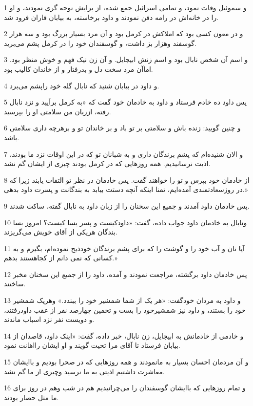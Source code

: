 \par 1 و سموئیل وفات نمود، و تمامی اسرائیل جمع شده، از برایش نوحه گری نمودند، و او را در خانه‌اش در رامه دفن نمودند و داود برخاسته، به بیابان فاران فرود شد.
\par 2 و در معون کسی بود که املاکش در کرمل بود و آن مرد بسیار بزرگ بود و سه هزار گوسفند وهزار بز داشت، و گوسفندان خود را در کرمل پشم می‌برید.
\par 3 و اسم آن شخص نابال بود و اسم زنش ابیجایل. و آن زن نیک فهم و خوش منظر بود. اماآن مرد سخت دل و بدرفتار و از خاندان کالیب بود.
\par 4 و داود در بیابان شنید که نابال گله خود راپشم می‌برد.
\par 5 پس داود ده خادم فرستاد و داود به خادمان خود گفت که «به کرمل برآیید و نزد نابال رفته، اززبان من سلامتی او را بپرسید.
\par 6 و چنین گویید: زنده باش و سلامتی بر تو باد و بر خاندان تو و برهرچه داری سلامتی باشد.
\par 7 و الان شنیده‌ام که پشم برندگان داری و به شبانان تو که در این اوقات نزد ما بودند، اذیت نرسانیدیم. همه روزهایی که در کرمل بودند چیزی از ایشان گم نشد.
\par 8 از خادمان خود بپرس و تو را خواهند گفت. پس خادمان در نظر تو التفات یابند زیرا که در روزسعادتمندی آمده‌ایم، تمنا اینکه آنچه دستت بیابد به بندگانت و پسرت داود بدهی.»
\par 9 پس خادمان داود آمدند و جمیع این سخنان را از زبان داود به نابال گفته، ساکت شدند.
\par 10 ونابال به خادمان داود جواب داده، گفت: «داودکیست و پسر یسا کیست؟ امروز بسا بندگان هریکی از آقای خویش می‌گریزند.
\par 11 آیا نان و آب خود را و گوشت را که برای پشم برندگان خودذبح نموده‌ام، بگیرم و به کسانی که نمی دانم از کجاهستند بدهم.»
\par 12 پس خادمان داود برگشته، مراجعت نمودند و آمده، داود را از جمیع این سخنان مخبر ساختند.
\par 13 و داود به مردان خودگفت: «هر یک از شما شمشیر خود را ببندد.» وهریک شمشیر خود را بستند، و داود نیز شمشیرخود را بست و تخمین چهارصد نفر از عقب داودرفتند، و دویست نفر نزد اسباب ماندند.
\par 14 و خادمی از خادمانش به ابیجایل، زن نابال، خبر داده، گفت: «اینک داود، قاصدان از بیابان فرستاد تا آقای مرا تحیت گویند و او ایشان رااهانت نمود.
\par 15 و آن مردمان احسان بسیار به مانمودند و همه روزهایی که در صحرا بودیم و باایشان معاشرت داشتیم اذیتی به ما نرسید وچیزی از ما گم نشد.
\par 16 و تمام روزهایی که باایشان گوسفندان را می‌چرانیدیم هم در شب وهم در روز برای ما مثل حصار بودند.
